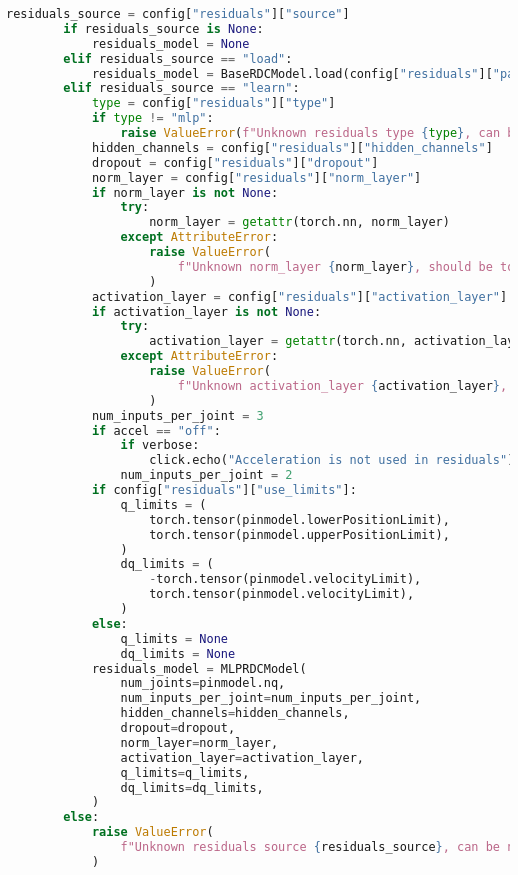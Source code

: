 \begin{lstlisting}[language=python, caption=\raggedright{identification/full.py}, frame=single]
        residuals_source = config["residuals"]["source"]
        if residuals_source is None:
            residuals_model = None
        elif residuals_source == "load":
            residuals_model = BaseRDCModel.load(config["residuals"]["path"])
        elif residuals_source == "learn":
            type = config["residuals"]["type"]
            if type != "mlp":
                raise ValueError(f"Unknown residuals type {type}, can be mlp only")
            hidden_channels = config["residuals"]["hidden_channels"]
            dropout = config["residuals"]["dropout"]
            norm_layer = config["residuals"]["norm_layer"]
            if norm_layer is not None:
                try:
                    norm_layer = getattr(torch.nn, norm_layer)
                except AttributeError:
                    raise ValueError(
                        f"Unknown norm_layer {norm_layer}, should be torch.nn.<norm_layer>"
                    )
            activation_layer = config["residuals"]["activation_layer"]
            if activation_layer is not None:
                try:
                    activation_layer = getattr(torch.nn, activation_layer)
                except AttributeError:
                    raise ValueError(
                        f"Unknown activation_layer {activation_layer}, should be torch.nn.<activation_layer>"
                    )
            num_inputs_per_joint = 3
            if accel == "off":
                if verbose:
                    click.echo("Acceleration is not used in residuals")
                num_inputs_per_joint = 2
            if config["residuals"]["use_limits"]:
                q_limits = (
                    torch.tensor(pinmodel.lowerPositionLimit),
                    torch.tensor(pinmodel.upperPositionLimit),
                )
                dq_limits = (
                    -torch.tensor(pinmodel.velocityLimit),
                    torch.tensor(pinmodel.velocityLimit),
                )
            else:
                q_limits = None
                dq_limits = None
            residuals_model = MLPRDCModel(
                num_joints=pinmodel.nq,
                num_inputs_per_joint=num_inputs_per_joint,
                hidden_channels=hidden_channels,
                dropout=dropout,
                norm_layer=norm_layer,
                activation_layer=activation_layer,
                q_limits=q_limits,
                dq_limits=dq_limits,
            )
        else:
            raise ValueError(
                f"Unknown residuals source {residuals_source}, can be null, load or learn"
            )


\end{lstlisting}
